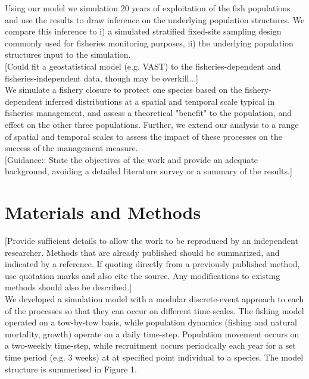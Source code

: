 \documentclass[review]{elsarticle}
\begin{document}
Using our model we simulation 20 years of exploitation of the fish populations
and use the results to draw inference on the underlying population structures.
We compare this inference to i) a simulated stratified fixed-site sampling
design commonly used for fisheries monitoring purposes, ii) the underlying
population structures input to the simulation.\\

[Could fit a geostatistical model (e.g. VAST) to the fisheries-dependent and
fisheries-independent data, though may be overkill...] \\

We simulate a fishery closure to protect one species based on the
fishery-dependent inferred distributions at a spatial and temporal scale
typical in fisheries management, and assess a theoretical "benefit" to the
population, and effect on the other three populations. Further, we extend our
analysis to a range of spatial and temporal scales to assess the impact of
these processes on the success of the management measure. \\

[Guidance:: State the objectives of the work and provide an adequate
background, avoiding a detailed literature survey or a summary of the results.]
\\

\section{Materials and Methods}

[Provide sufficient details to allow the work to be reproduced by an
independent researcher. Methods that are already published should be
summarized, and indicated by a reference.  If quoting directly from a
previously published method, use quotation marks and also cite the source. Any
modifications to existing methods should also be described.] \\

We developed a simulation model with a modular discrete-event approach to each
of the processes so that they can occur on different time-scales. The fishing
model operated on a tow-by-tow basis, while population dynamics (fishing and
natural mortality, growth) operate on a daily time-step.  Population movement
occurs on a two-weekly time-step, while recruitment occurs periodcally each
year for a set time period (e.g. 3 weeks) at at specified point individual to a
species. The model structure is summerised in Figure 1.  \\
\end{document}
